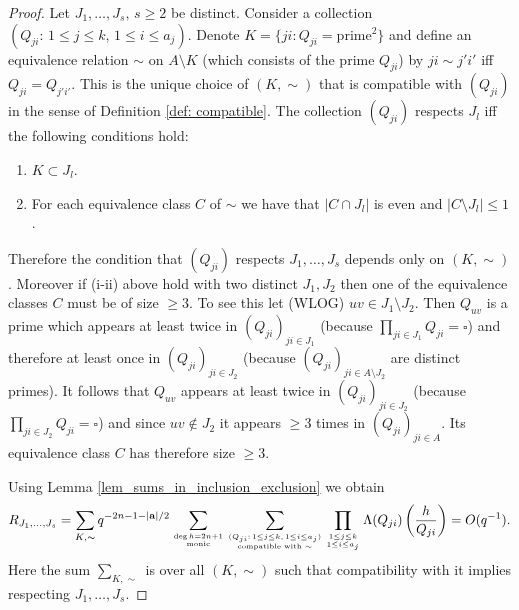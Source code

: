 \documentclass[alphabetic, 
        colorlinks,
        linkcolor=red,  citecolor=blue,
        backref
]{amsart}
\numberwithin{equation}{section}
\theoremstyle{definition}
\begin{document}
\begin{proof}
Let $J_1,\ldots,J_s,\,s\ge 2$ be distinct. Consider a collection $(Q_{ji}:\,1\le j\le k,\,1\le i\le a_j)$. Denote $K=\{ji: Q_{ji}=\text{prime}^2\}$ and define an equivalence relation $\sim$ on $A\setminus K$ (which consists of the prime $Q_{ji}$) by $ji\sim j'i'$ iff $Q_{ji}=Q_{j'i'}$. This is the unique choice of $(K,\sim)$ that is compatible with $(Q_{ji})$ in the sense of Definition \ref{def: compatible}. The collection $(Q_{ji})$ respects $J_l$ iff the following conditions hold:
\begin{enumerate}
\item[(i)] $K\subset J_l$.
\item[(ii)] For each equivalence class $C$ of $\sim$ we have that $|C\cap J_l|$ is even and $|C\setminus J_l|\le 1$.
\end{enumerate}
Therefore the condition that $(Q_{ji})$ respects $J_1,\ldots,J_s$ depends only on $(K,\sim)$. Moreover if (i-ii) above hold with two distinct $J_1,J_2$ then one of the equivalence classes $C$ must be of size $\ge 3$. To see this let (WLOG) $uv\in J_1\setminus J_2$. Then $Q_{uv}$ is a prime which appears at least twice in $(Q_{ji})_{ji\in J_1}$ (because $\prod_{ji\in J_1}Q_{ji}=\square$) and therefore at least once in $(Q_{ji})_{ji\in J_2}$ (because $(Q_{ji})_{ji\in A\setminus J_2}$ are distinct primes). It follows that $Q_{uv}$ appears at least twice in $(Q_{ji})_{ji\in J_2}$ (because $\prod_{ji\in J_2}Q_{ji}=\square$) and since $uv\not\in J_2$ it appears $\ge 3$ times in $(Q_{ji})_{ji\in A}$. Its equivalence class $C$ has therefore size $\ge 3$. 

Using Lemma \ref{lem_sums_in_inclusion_exclusion} we obtain
$$R_{J_1,\ldots,J_s}=\sum_{K,\sim}q^{-2n-1-|\mathbf a|/2}\sum_{\deg h=2n+1\atop{\text{monic}}}\sum_{(Q_{ji}:\,1\le j\le k,\,1\le i\le a_j)\atop{\text{compatible with $\sim$}}}\prod_{1\le j\le k\atop{1\le i\le a_j}}\Lambda(Q_{ji})\left(\frac h{Q_{ji}}\right)=O(q^{-1}).$$
Here the sum $\sum_{K,\sim}$ is over all $(K,\sim)$ such that compatibility with it implies respecting $J_1,\ldots,J_s$.





\end{proof}
\end{document}
